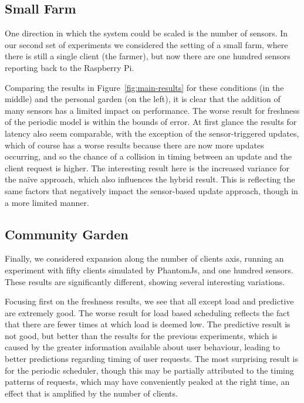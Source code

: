 \documentclass[a4paper]{acm_proc_article-sp}
\makeatletter
\newcommand{\naive}{na\"{i}ve\@\xspace}
\makeatother
\begin{document}
\subsection{Small Farm}

One direction in which the system could be scaled is the number of sensors.  In our second set of experiments we considered the setting of a small farm, where there is still a single client (the farmer), but now there are one hundred sensors reporting back to the Raspberry Pi.

Comparing the results in Figure~\ref{fig:main-results} for these conditions (in the middle) and the personal garden (on the left), it is clear that the addition of many sensors has a limited impact on performance.  The worse result for freshness of the periodic model is within the bounds of error.  At first glance the results for latency also seem comparable, with the exception of the sensor-triggered updates, which of course has a worse results because there are now more updates occurring, and so the chance of a collision in timing between an update and the client request is higher.  The interesting result here is the increased variance for the \naive approach, which also influences the hybrid result.  This is reflecting the same factors that negatively impact the sensor-based update approach, though in a more limited manner.

\subsection{Community Garden}

Finally, we considered expansion along the number of clients axis, running an experiment with fifty clients simulated by PhantomJs, and one hundred sensors.  These results are significantly different, showing several interesting variations.

Focusing first on the freshness results, we see that all except load and predictive are extremely good.  The worse result for load based scheduling reflects the fact that there are fewer times at which load is deemed low.  The predictive result is not good, but better than the results for the previous experiments, which is caused by the greater information available about user behaviour, leading to better predictions regarding timing of user requests.  The most surprising result is for the periodic scheduler, though this may be partially attributed to the timing patterns of requests, which may have conveniently peaked at the right time, an effect that is amplified by the number of clients.
\end{document}
